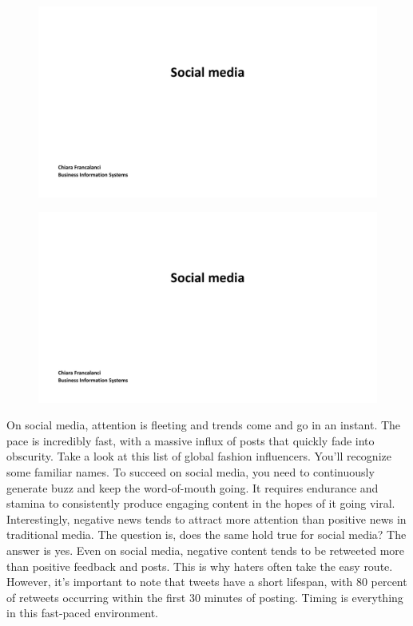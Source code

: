 \begin{figure}[!h]
    \centering
    \includegraphics[page=21, trim = 2cm 8cm 3cm 4cm, clip, width=\textwidth]{images/04 - Social_Media.pdf}
\end{figure}

\begin{figure}[!h]
    \centering
    \includegraphics[page=22, trim = 2cm 5cm 3cm 3.5cm, clip, width=\textwidth]{images/04 - Social_Media.pdf}
\end{figure}

On social media, attention is fleeting and trends come and go in an
instant. The pace is incredibly fast, with a massive influx of posts
that quickly fade into obscurity. Take a look at this list of global
fashion influencers. You'll recognize some familiar names. To succeed on
social media, you need to continuously generate buzz and keep the
word-of-mouth going. It requires endurance and stamina to consistently
produce engaging content in the hopes of it going viral. Interestingly,
negative news tends to attract more attention than positive news in
traditional media. The question is, does the same hold true for social
media? The answer is yes. Even on social media, negative content tends
to be retweeted more than positive feedback and posts. This is why
haters often take the easy route. However, it's important to note that
tweets have a short lifespan, with 80 percent of retweets occurring
within the first 30 minutes of posting. Timing is everything in this
fast-paced environment.

